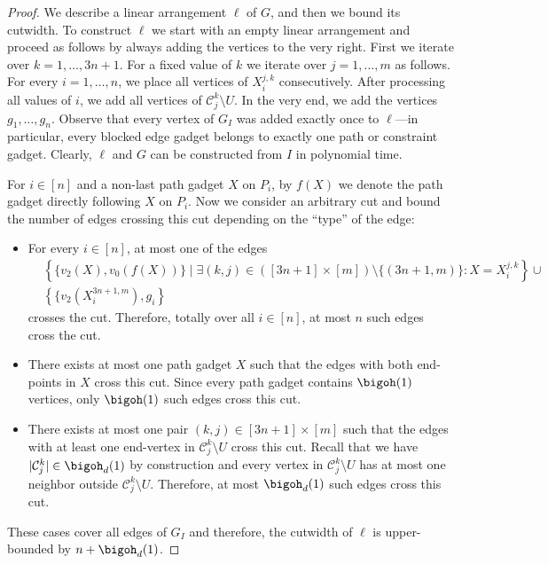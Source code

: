 \documentclass[a4paper,UKenglish,cleveref, autoref, thm-restate]{lipics-v2021}
\begin{document}
\begin{proof}
    We describe a linear arrangement $\ell$ of $G$, and then we bound its cutwidth. 
    To construct $\ell$ we start with an empty linear arrangement and proceed as follows by always adding the vertices to the very right.
    First we iterate over $k = 1, \dots, 3n+1$.
    For a fixed value of $k$ we iterate over $j = 1, \dots, m$ as follows.
    For every $i = 1, \dots, n$, we place all vertices of $X_i^{j,k}$ consecutively.
    After processing all values of $i$, we add all vertices of $\mathcal{C}_j^k \setminus U$.
    In the very end, we add the vertices $g_1, \dots, g_n$.
    Observe that every vertex of $G_I$ was added exactly once to $\ell$---in particular, every blocked edge gadget belongs to exactly one path or constraint gadget.
    Clearly, $\ell$ and $G$ can be constructed from $I$ in polynomial time.
    

    For $i \in [n]$ and a non-last path gadget $X$ on $P_i$, by $f(X)$ we denote the path gadget directly following $X$ on $P_i$.
    Now we consider an arbitrary cut and bound the number of edges crossing this cut depending on the ``type'' of the edge:
    \begin{itemize}
     \item For every $i \in [n]$, at most one of the edges 
     \begin{align*}
        &\left\{\{v_2(X), v_0(f(X))\} \mid \exists (k,j) \in ([3n+1] \times [m]) \setminus \{(3n+1, m)\} \colon X = X_i^{j,k}\right\} \cup \\
        &\left\{\{v_2(X_i^{3n+1, m}), g_i\right\}
     \end{align*}
        crosses the cut.
        Therefore, totally over all $i \in [n]$, at most $n$ such edges cross the cut.
    \item There exists at most one path gadget $X$ such that the edges with both end-points in $X$ cross this cut.
    Since every path gadget contains $\bigoh(1)$ vertices, only $\bigoh(1)$ such edges cross this cut.
    \item There exists at most one pair $(k, j) \in [3n+1] \times [m]$ such that the edges with at least one end-vertex in $\mathcal{C}_j^k \setminus U$ cross this cut.
    Recall that we have $|\mathcal{C}_j^k| \in \bigoh_d(1)$ by construction and every vertex in $\mathcal{C}_j^k \setminus U$ has at most one neighbor outside $\mathcal{C}_j^k \setminus U$. 
    Therefore, at most $\bigoh_d(1)$ such edges cross this cut.
    \end{itemize}
    These cases cover all edges of $G_I$ and therefore, the cutwidth of $\ell$ is upper-bounded by $n+\bigoh_d(1)$.
\end{proof}
\end{document}
